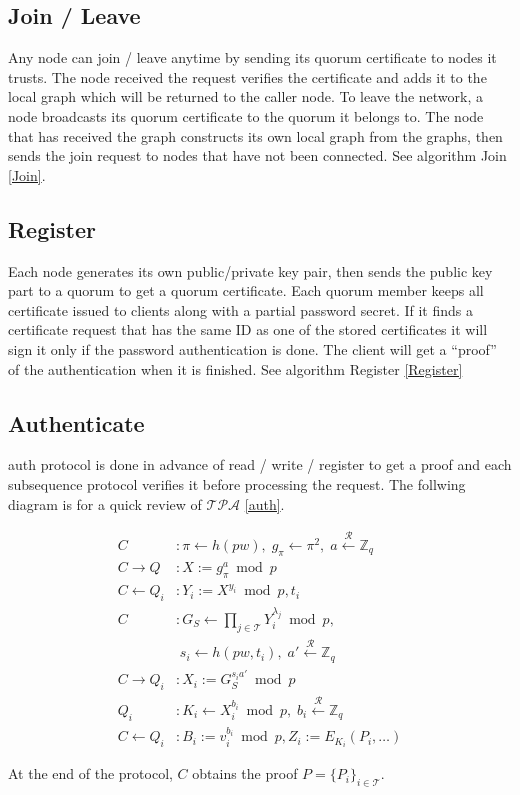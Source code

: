 \subsection{Join / Leave}
Any node can join / leave anytime by sending its quorum certificate to
nodes it trusts. The node received the request verifies the
certificate and adds it to the local graph which will be returned to
the caller node. To leave the network, a node broadcasts its quorum
certificate to the quorum it belongs to.
The node that has received the graph constructs its own local graph
from the graphs, then sends the join request to nodes that have not
been connected.
See algorithm {\sf Join} \ref{Join}.

\subsection{Register}
\label{register}
Each node generates its own public/private key pair, then sends the
public key part to a quorum to get a quorum certificate. Each quorum
member keeps all certificate issued to clients along with a partial
password secret. If it finds a certificate request that has the same
ID as one of the stored certificates it will sign it only if the
password authentication is done. The client will get a ``proof'' of
the authentication when it is finished.
See algorithm {\sf Register} \ref{Register}

\subsection{Authenticate}
\label{authenticate}
{\sf auth} protocol is done in advance of {\sf read / write /
  register} to get a proof and each subsequence protocol verifies it
before processing the request. The follwing diagram is for a quick
review of $\mathcal{TPA}$ \ref{auth}.

\begin{align*}
  C &: \pi \leftarrow h(pw), \;
      g_{\pi} \leftarrow \pi^2, \;
      a \xleftarrow{\mathcal{R}} \mathbb{Z}_q \\
  C \rightarrow Q &: X := g_{\pi}^a \bmod p \\
  C \leftarrow Q_i &: Y_i := X^{y_i} \bmod p, t_i \\
  C &: G_S \leftarrow \textstyle \prod_{j \in \mathcal{T}}Y_i^{\lambda_j} \bmod p, \\
    & \; s_i \leftarrow h(pw, t_i), \;
      a' \xleftarrow{\mathcal{R}} \mathbb{Z}_q \\
  C \rightarrow Q_i &: X_i := G_S^{s_ia'} \bmod p \\
  Q_i &: K_i \leftarrow X_i^{b_i} \bmod p, \;
        b_i \xleftarrow{\mathcal{R}} \mathbb{Z}_q \\
  C \leftarrow Q_i &: B_i := v_i^{b_i} \bmod p,
                     Z_i := E_{K_i}(P_i, \dots) 
\end{align*}

At the end of the protocol, $C$ obtains the proof $P = \{P_i\}_{i \in
  \mathcal{T}}$.
